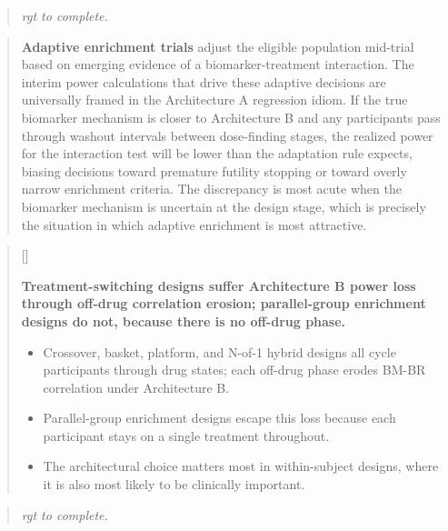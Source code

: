 \documentclass[
  11pt,
]{article}
\newcounter{pgraph}
\newenvironment{bullets}{%
  \stepcounter{pgraph}%
  \begin{quote}\small\sffamily\color[gray]{0.30}%
  {\normalfont\scriptsize\color[gray]{0.58}[\thepgraph]\enspace}}{%
  \end{quote}}
\newenvironment{rgt}{%
  \begin{quote}\small\itshape\color[RGB]{20,60,160}}{%
  \end{quote}}
\newenvironment{orig}{%
  \begin{quote}\normalsize\color[gray]{0.55}}{%
  \end{quote}}
\begin{document}
\begin{rgt}
rgt to complete.

\end{rgt}

\begin{orig}
\textbf{Adaptive enrichment trials} adjust the eligible population
mid-trial based on emerging evidence of a biomarker-treatment
interaction. The interim power calculations that drive these adaptive
decisions are universally framed in the Architecture A regression idiom.
If the true biomarker mechanism is closer to Architecture B and any
participants pass through washout intervals between dose-finding stages,
the realized power for the interaction test will be lower than the
adaptation rule expects, biasing decisions toward premature futility
stopping or toward overly narrow enrichment criteria. The discrepancy is
most acute when the biomarker mechanism is uncertain at the design
stage, which is precisely the situation in which adaptive enrichment is
most attractive.

\end{orig}

\begin{bullets}

\textbf{Treatment-switching designs suffer Architecture B power
loss through off-drug correlation erosion; parallel-group enrichment designs
do not, because there is no off-drug phase.}

\begin{itemize}\setlength{\itemsep}{2pt}\setlength{\parskip}{0pt}
\item Crossover, basket, platform, and N-of-1 hybrid designs all
  cycle participants through drug states; each off-drug phase
  erodes BM-BR correlation under Architecture B.
\item Parallel-group enrichment designs escape this loss because
  each participant stays on a single treatment throughout.
\item The architectural choice matters most in within-subject
  designs, where it is also most likely to be clinically
  important.
\end{itemize}

\end{bullets}

\begin{rgt}
rgt to complete.

\end{rgt}
\end{document}
